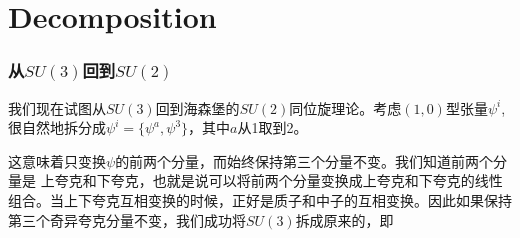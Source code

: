 \documentclass[CJK]{beamer}
\begin{document}
\section{Decomposition}
\begin{frame}\frametitle{\bch 从$SU(3)$回到$SU(2)$\ech}
  \bch
  我们现在试图从$SU(3)$回到海森堡的$SU(2)$同位旋理论。考虑$(1,0)$型张量$\psi^i$,很自然地拆分成$\psi^i=\{\psi^a,\psi^3\}$，其中$a$从1取到2。

  这意味着只变换$\psi$的前两个分量，而始终保持第三个分量不变。我们知道前两个分量是
  上夸克和下夸克，也就是说可以将前两个分量变换成上夸克和下夸克的线性组合。当上下夸克互相变换的时候，正好是质子和中子的互相变换。因此如果保持第三个奇异夸克分量不变，我们成功将$SU(3)$拆成原来的，即
   
  \ee
  \ech
\end{frame}
\end{document}
